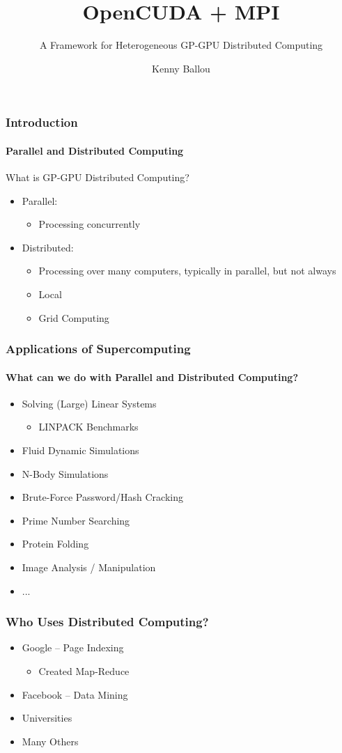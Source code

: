\documentclass{beamer}
\title{OpenCUDA + MPI}
\subtitle{A Framework for Heterogeneous GP-GPU Distributed Computing}
\author[Ballou]{Kenny Ballou}
\begin{document}
\frame{\titlepage}
\begin{frame}
\frametitle{Introduction}
\framesubtitle{Parallel and Distributed Computing}
What is GP-GPU Distributed Computing?
\begin{itemize}
\item{Parallel:}
\begin{itemize}
\item{Processing concurrently}
\end{itemize}
\item{Distributed:}
\begin{itemize}
\item{Processing over many computers, typically in parallel, but not always}
\item{Local}
\item{Grid Computing}
\end{itemize}
\end{itemize}
\end{frame}
\begin{frame}
\frametitle{Applications of Supercomputing}
\framesubtitle{What can we do with Parallel and Distributed Computing?}
\begin{itemize}
\item{Solving (Large) Linear Systems}
\begin{itemize}
\item{LINPACK Benchmarks}
\end{itemize}
\item{Fluid Dynamic Simulations}
\item{N-Body Simulations}
\item{Brute-Force Password/Hash Cracking}
\item{Prime Number Searching}
\item{Protein Folding}
\item{Image Analysis / Manipulation}
\item{...}
\end{itemize}
\end{frame}
\begin{frame}
\frametitle{Who Uses Distributed Computing?}
\begin{itemize}
\item{Google -- Page Indexing}
\begin{itemize}
\item{Created Map-Reduce}
\end{itemize}
\item{Facebook -- Data Mining}
\item{Universities}
\item{Many Others}
\end{itemize}
\end{frame}
\end{document}
